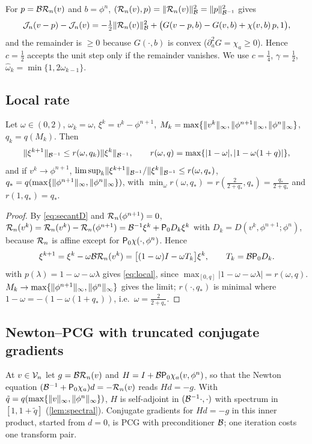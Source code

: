 \begin{remark}\label{rem:c}
For $p=\mathcal{B}\mathcal{R}_n(v)$ and $b=\phi^n$, $(\mathcal{R}_n(v),p)=\lVert \mathcal{R}_n(v)\rVert_{\mathcal{B}}^2=\lVert p\rVert_{\mathcal{B}^{-1}}^2$ gives
\[
\mathcal{J}_n(v-p)-\mathcal{J}_n(v)=-\tfrac12\lVert \mathcal{R}_n(v)\rVert_{\mathcal{B}}^2+\big(G(v-p,b)-G(v,b)+\chi(v,b)\,p,1\big),
\]
and the remainder is $\ge0$ because $G(\cdot,b)$ is convex ($\partial_a^2G=\chi_a\ge0$). Hence $c=\frac12$ accepts the unit step only if the remainder vanishes. We use $c=\frac14$, $\gamma=\frac12$, $\hat\omega_k=\min\{1,2\omega_{k-1}\}$.
\end{remark}

\subsection{Local rate}
\begin{theorem}\label{thm:local}
Let $\omega\in(0,2)$, $\omega_k=\omega$, $\xi^k=v^k-\phi^{n+1}$, $M_k=\max\{\lVert v^k\rVert_\infty,\lVert \phi^{n+1}\rVert_\infty,\lVert \phi^n\rVert_\infty\}$, $q_k=q(M_k)$. Then
\begin{equation}\label{eq:local}
\lVert \xi^{k+1}\rVert_{\mathcal{B}^{-1}}\le r(\omega,q_k)\lVert \xi^k\rVert_{\mathcal{B}^{-1}},\qquad r(\omega,q)=\max\{|1-\omega|,|1-\omega(1+q)|\},
\end{equation}
and if $v^k\to\phi^{n+1}$, $\limsup_k\lVert \xi^{k+1}\rVert_{\mathcal{B}^{-1}}/\lVert \xi^k\rVert_{\mathcal{B}^{-1}}\le r(\omega,q_*)$, $q_*=q(\max\{\lVert \phi^{n+1}\rVert_\infty,\lVert \phi^n\rVert_\infty\})$, with $\min_\omega r(\omega,q_*)=r(\frac2{2+q_*},q_*)=\frac{q_*}{2+q_*}$ and $r(1,q_*)=q_*$.
\end{theorem}

\begin{proof}
By \eqref{eq:secantD} and $\mathcal{R}_n(\phi^{n+1})=0$, $\mathcal{R}_n(v^k)=\mathcal{R}_n(v^k)-\mathcal{R}_n(\phi^{n+1})=\mathcal{B}^{-1}\xi^k+\mathsf{P}_0 D_k\xi^k$ with $D_k=D(v^k,\phi^{n+1};\phi^n)$, because $\mathcal{R}_n$ is affine except for $\mathsf{P}_0\chi(\cdot,\phi^n)$. Hence
\begin{equation}\label{eq:errorprop}
\xi^{k+1}=\xi^k-\omega\mathcal{B}\mathcal{R}_n(v^k)=\big[(1-\omega)I-\omega T_k\big]\xi^k,\qquad T_k=\mathcal{B}\mathsf{P}_0 D_k .
\end{equation}
 with $p(\lambda)=1-\omega-\omega\lambda$ gives \eqref{eq:local}, since $\max_{[0,q]}|1-\omega-\omega\lambda|=r(\omega,q)$. $M_k\to\max\{\lVert \phi^{n+1}\rVert_\infty,\lVert \phi^n\rVert_\infty\}$ gives the limit; $r(\cdot,q_*)$ is minimal where $1-\omega=-(1-\omega(1+q_*))$, i.e.\ $\omega=\frac2{2+q_*}$.
\end{proof}

\subsection{Newton--PCG with truncated conjugate gradients}
At $v\in\mathcal{V}_n$ let $g=\mathcal{B}\mathcal{R}_n(v)$ and $H=I+\mathcal{B}\mathsf{P}_0\chi_a(v,\phi^n)$, so that the Newton equation $(\mathcal{B}^{-1}+\mathsf{P}_0\chi_a)d=-\mathcal{R}_n(v)$ reads $Hd=-g$. With $\tilde q=q(\max\{\lVert v\rVert_\infty,\lVert \phi^n\rVert_\infty\})$, $H$ is self-adjoint in $(\mathcal{B}^{-1}\cdot,\cdot)$ with spectrum in $[1,1+\tilde q]$ (\cref{lem:spectral}). Conjugate gradients for $Hd=-g$ in this inner product, started from $d=0$, is PCG with preconditioner $\mathcal{B}$; one iteration costs one transform pair.

